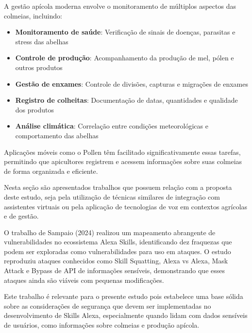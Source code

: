 A gestão apícola moderna envolve o monitoramento de múltiplos aspectos das colmeias, incluindo:
\begin{itemize}
    \item \textbf{Monitoramento de saúde}: Verificação de sinais de doenças, parasitas e stress das abelhas
    \item \textbf{Controle de produção}: Acompanhamento da produção de mel, pólen e outros produtos
    \item \textbf{Gestão de enxames}: Controle de divisões, capturas e migrações de enxames
    \item \textbf{Registro de colheitas}: Documentação de datas, quantidades e qualidade dos produtos
    \item \textbf{Análise climática}: Correlação entre condições meteorológicas e comportamento das abelhas
\end{itemize}

Aplicações móveis como o Pollen têm facilitado significativamente essas tarefas, permitindo que apicultores registrem e acessem informações sobre suas colmeias de forma organizada e eficiente.


Nesta seção são apresentados trabalhos que possuem relação com a proposta deste estudo, seja pela utilização de técnicas similares de integração com assistentes virtuais ou pela aplicação de tecnologias de voz em contextos agrícolas e de gestão.


O trabalho de Sampaio (2024) realizou um mapeamento abrangente de vulnerabilidades no ecossistema Alexa Skills, identificando dez fraquezas que podem ser exploradas como vulnerabilidades para uso em ataques. 
O estudo reproduziu ataques conhecidos como Skill Squatting, Alexa vs Alexa, Mask Attack e Bypass de API de informações sensíveis, demonstrando que esses ataques ainda são viáveis com pequenas modificações.

Este trabalho é relevante para o presente estudo pois estabelece uma base sólida sobre as considerações de segurança que devem ser implementadas no desenvolvimento de Skills Alexa, 
especialmente quando lidam com dados sensíveis de usuários, como informações sobre colmeias e produção apícola.


